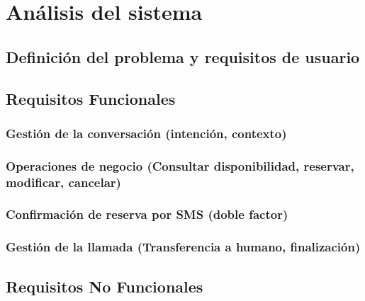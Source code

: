 \chapter{\textbf{Análisis del sistema}}
\label{ch:Analisis}
\thispagestyle{fancy}

\section{Definición del problema y requisitos de usuario}
\label{sec:definicion_problema}

\textoBase

\textoBaseAlt

\section{Requisitos Funcionales}
\label{sec:requisitos_funcionales}

\textoBase

\subsection{Gestión de la conversación (intención, contexto)}
\label{subsec:gestion_conversacion}

\textoBaseAlt

\subsection{Operaciones de negocio (Consultar disponibilidad, reservar, modificar, cancelar)}
\label{subsec:operaciones_negocio}

\textoBase

\subsection{Confirmación de reserva por SMS (doble factor)}
\label{subsec:confirmacion_sms}

\textoBaseAlt

\subsection{Gestión de la llamada (Transferencia a humano, finalización)}
\label{subsec:gestion_llamada}

\textoBase

\section{Requisitos No Funcionales}
\label{sec:requisitos_no_funcionales}

